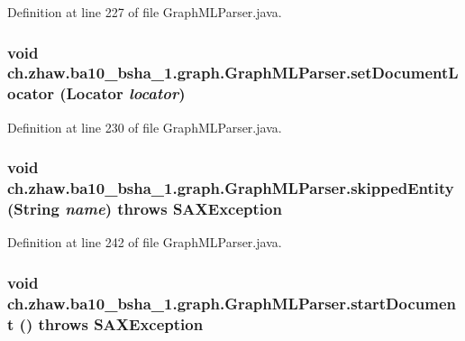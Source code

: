 Definition at line 227 of file GraphMLParser.java.\hypertarget{classch_1_1zhaw_1_1ba10__bsha__1_1_1graph_1_1GraphMLParser_aff550f1ff85c53385477bfe9b674323b}{
\subsubsection[{setDocumentLocator}]{\setlength{\rightskip}{0pt plus 5cm}void ch.zhaw.ba10\_\-bsha\_\-1.graph.GraphMLParser.setDocumentLocator (Locator {\em locator})}}
\label{classch_1_1zhaw_1_1ba10__bsha__1_1_1graph_1_1GraphMLParser_aff550f1ff85c53385477bfe9b674323b}


Definition at line 230 of file GraphMLParser.java.\hypertarget{classch_1_1zhaw_1_1ba10__bsha__1_1_1graph_1_1GraphMLParser_ac3138b26d478aef2b67820bf35cd3b1f}{
\subsubsection[{skippedEntity}]{\setlength{\rightskip}{0pt plus 5cm}void ch.zhaw.ba10\_\-bsha\_\-1.graph.GraphMLParser.skippedEntity (String {\em name})  throws SAXException }}
\label{classch_1_1zhaw_1_1ba10__bsha__1_1_1graph_1_1GraphMLParser_ac3138b26d478aef2b67820bf35cd3b1f}


Definition at line 242 of file GraphMLParser.java.\hypertarget{classch_1_1zhaw_1_1ba10__bsha__1_1_1graph_1_1GraphMLParser_ae7ac9d9c1d64eecaf87b1a68d65ae5c0}{
\subsubsection[{startDocument}]{\setlength{\rightskip}{0pt plus 5cm}void ch.zhaw.ba10\_\-bsha\_\-1.graph.GraphMLParser.startDocument ()  throws SAXException }}
\label{classch_1_1zhaw_1_1ba10__bsha__1_1_1graph_1_1GraphMLParser_ae7ac9d9c1d64eecaf87b1a68d65ae5c0}


